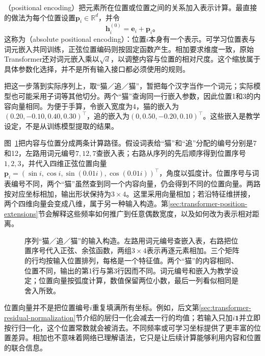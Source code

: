 （positional encoding）把元素所在位置或位置之间的关系加入表示计算。最直接的做法为每个位置设置$\bm p_i\in\mathbb R^d$，并令
\begin{equation}
  \bm h_i^{(0)}=\bm e_i+\bm p_i\text{。}
  \label{eq:transformer-input-position}
\end{equation}
这称为（absolute positional encoding）：位置$i$本身有一个表示。可学习位置表与词元嵌入共同训练，正弦位置编码则按固定函数产生。相加要求维度一致，原始Transformer还对词元嵌入乘以$\sqrt d$，以调整内容与位置的相对尺度。这个缩放属于具体参数化选择，并不是所有输入接口都必须使用的规则。

把这一步落到实际序列上，取“猫／追／猫”，暂把每个汉字当作一个词元；实际模型也可能采用子词等其他切分。两个“猫”查询同一行嵌入参数，因此位置1和3的内容向量相同。为便于手算，令嵌入宽度为4，猫的嵌入为$(0.20,-0.10,0.40,0.30)^{\top}$，追的嵌入为$(0,0.50,-0.20,0.10)^{\top}$。这些嵌入是教学设定，不是从训练模型提取的结果。

图~\ref{fig:transformer-position-example}把内容与位置分成两条计算路径。假设词表给“猫”和“追”分配的编号分别是7和12，左路用词元编号$7,12,7$查嵌入表；右路从序列的先后顺序得到位置序号$1,2,3$，并代入四维正弦位置向量$\bm p_i=(\sin i,\cos i,\sin(0.01i),\cos(0.01i))^{\top}$，角度以弧度计。位置序号与词表编号不同，两个“猫”虽然查到同一个内容向量，仍会得到不同的位置向量。两路按对应坐标相加，输出形状保持为$3\times4$。这里采用向量相加；若沿特征维拼接，两个四维向量会变成八维，属于另一种输入构造。第\ref{sec:transformer-position-extensions}节会解释这些频率如何推广到任意偶数宽度，以及如何改为表示相对距离。

\begin{figure}[htbp]
  \centering
  
  \caption{序列“猫／追／猫”的输入构造。左路用词元编号查嵌入表，右路把位置序号代入正弦、余弦函数，两组$3\times4$表示再逐元素相加。三个矩阵的行均按输入位置排列，每格是一个特征值。两个“猫”的内容相同、位置不同，输出的第1行与第3行因而不同。词元编号和嵌入为教学设定；位置向量按弧度计算，数值保留两位小数，最后一列看似相同是舍入所致。}
  \label{fig:transformer-position-example}
\end{figure}
\FloatBarrier

位置向量并不是把位置编号$i$重复填满所有坐标。例如，后文第\ref{sec:transformer-residual-normalization}节介绍的层归一化会减去一行的均值；若输入只加$i\bm1$并立即按行归一化，这个位置常数就会被消去。不同频率或可学习坐标提供了更丰富的位置差异。相加也不意味着网络已理解语法，它只是让后续计算能够利用内容和位置的联合信息。

